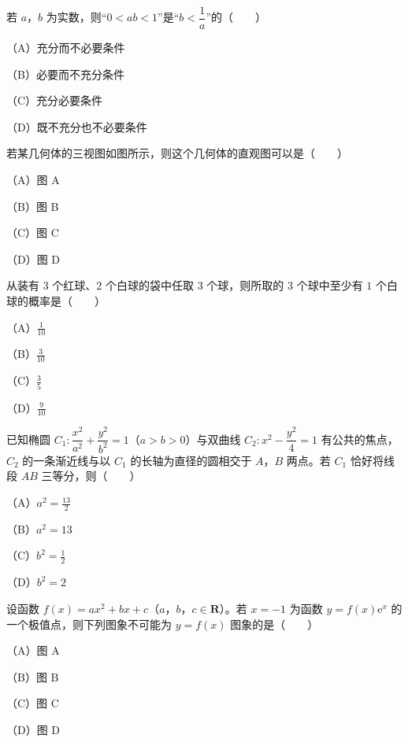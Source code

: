 \begin{question}
若 $a$，$b$ 为实数，则“$0<ab<1$”是“$b<\dfrac1a$”的\mbox{（　　）}

（A）充分而不必要条件

（B）必要而不充分条件

（C）充分必要条件

（D）既不充分也不必要条件

\Needspace{0.4\textheight}
\end{question}
\begin{question}
若某几何体的三视图如图所示，则这个几何体的直观图可以是\mbox{（　　）}

（A）图 A

（B）图 B

（C）图 C

（D）图 D
\nopagebreak[4]
\begin{center}\end{center}
\nopagebreak[4]
\end{question}
\begin{question}
从装有 $3$ 个红球、$2$ 个白球的袋中任取 $3$ 个球，则所取的 $3$ 个球中至少有 $1$ 个白球的概率是\mbox{（　　）}

（A）$\frac1{10}$

（B）$\frac3{10}$

（C）$\frac35$

（D）$\frac9{10}$

\end{question}
\begin{question}
已知椭圆 $C_1:\dfrac{x^2}{a^2}+\dfrac{y^2}{b^2}=1$（$a>b>0$）与双曲线 $C_2:x^2-\dfrac{y^2}4=1$ 有公共的焦点，$C_2$ 的一条渐近线与以 $C_1$ 的长轴为直径的圆相交于 $A$，$B$ 两点。若 $C_1$ 恰好将线段 $AB$ 三等分，则\mbox{（　　）}

（A）$a^2=\frac{13}2$

（B）$a^2=13$

（C）$b^2=\frac12$

（D）$b^2=2$

\Needspace{0.4\textheight}
\end{question}
\begin{question}
设函数 $f(x)=ax^2+bx+c$（$a$，$b$，$c\in\mathbf R$）。若 $x=-1$ 为函数 $y=f(x)\mathrm e^x$ 的一个极值点，则下列图象不可能为 $y=f(x)$ 图象的是\mbox{（　　）}

（A）图 A

（B）图 B

（C）图 C

（D）图 D
\nopagebreak[4]
\begin{center}\end{center}
\nopagebreak[4]
\end{question}

